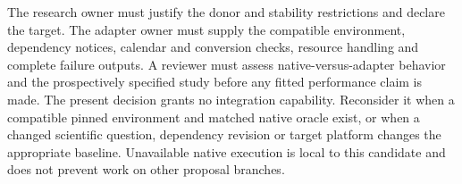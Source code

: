 The research owner must justify the donor and stability restrictions and
declare the target. The adapter owner must supply the compatible environment,
dependency notices, calendar and conversion checks, resource handling and
complete failure outputs. A reviewer must assess native-versus-adapter
behavior and the prospectively specified study before any fitted performance
claim is made. The present decision grants no integration capability.
Reconsider it when a compatible pinned environment and matched native oracle
exist, or when a changed scientific question, dependency revision or target
platform changes the appropriate baseline. Unavailable native execution is
local to this candidate and does not prevent work on other proposal branches.
\citep{exec13_ci_reuse}
\label{exec13:causalimpact-reuse-end}
